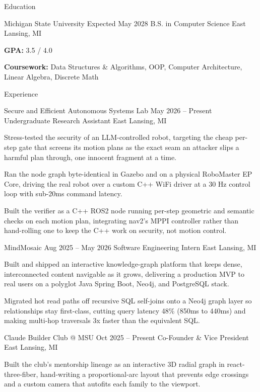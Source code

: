 \documentclass[
	11pt
]{../../../template}
\begin{document}
	\begin{rSection}{E}{ducation}
		\begin{rSectionEntry}
			{Michigan State University}
			{Expected May 2028}
			{B.S. in Computer Science}
			{}
			{East Lansing, MI}

			\item \textbf{GPA:} 3.5 / 4.0
			\item \textbf{Coursework:} Data Structures \& Algorithms, OOP, Computer Architecture, Linear Algebra, Discrete Math
		\end{rSectionEntry}
	\end{rSection}

	\begin{rSection}{E}{xperience}
		\begin{rSectionEntry}
			{Secure and Efficient Autonomous Systems Lab}
			{May 2026 -- Present}
			{Undergraduate Research Assistant}
			{}
			{East Lansing, MI}

			\item Stress-tested the security of an LLM-controlled robot, targeting the cheap per-step gate that screens its motion plans as the exact seam an attacker slips a harmful plan through, one innocent fragment at a time.
			\item Ran the node graph byte-identical in Gazebo and on a physical RoboMaster EP Core, driving the real robot over a custom C++ WiFi driver at a 30 Hz control loop with sub-20ms command latency.
			\item Built the verifier as a C++ ROS2 node running per-step geometric and semantic checks on each motion plan, integrating nav2's MPPI controller rather than hand-rolling one to keep the C++ work on security, not motion control.
		\end{rSectionEntry}

		\begin{rSectionEntry}
			{MindMosaic}
			{Aug 2025 -- May 2026}
			{Software Engineering Intern}
			{}
			{East Lansing, MI}

			\item Built and shipped an interactive knowledge-graph platform that keeps dense, interconnected content navigable as it grows, delivering a production MVP to real users on a polyglot Java Spring Boot, Neo4j, and PostgreSQL stack.
			\item Migrated hot read paths off recursive SQL self-joins onto a Neo4j graph layer so relationships stay first-class, cutting query latency 48\% (850ms to 440ms) and making multi-hop traversals 3x faster than the equivalent SQL.
		\end{rSectionEntry}

		\begin{rSectionEntry}
			{Claude Builder Club @ MSU}
			{Oct 2025 -- Present}
			{Co-Founder \& Vice President}
			{}
			{East Lansing, MI}

			\item Built the club's mentorship lineage as an interactive 3D radial graph in react-three-fiber, hand-writing a proportional-arc layout that prevents edge crossings and a custom camera that autofits each family to the viewport.
		\end{rSectionEntry}
	\end{rSection}
\end{document}
